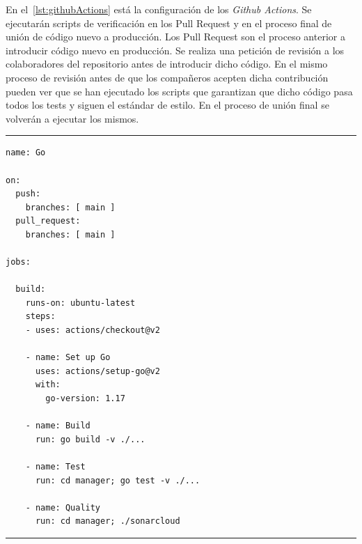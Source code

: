 En el~\cref{lst:githubActions} está la configuración de los \textit{Github Actions}.
Se ejecutarán scripts de verificación en los Pull Request y en el proceso final de unión de código nuevo a producción.
Los Pull Request son el proceso anterior a introducir código nuevo en producción.
Se realiza una petición de revisión a los colaboradores del repositorio antes de introducir dicho código.
En el mismo proceso de revisión antes de que los compañeros acepten dicha contribución pueden ver que se han ejecutado los scripts que garantizan que dicho código pasa todos los tests y siguen el estándar de estilo.
En el proceso de unión final se volverán a ejecutar los mismos.

\phantom{blank}
\vspace{10mm}
\hrule

\begin{lstlisting}[language=github,caption={Dockerfile.yml},breaklines=true,label={lst:githubActions}]
name: Go

on:
  push:
    branches: [ main ]
  pull_request:
    branches: [ main ]

jobs:

  build:
    runs-on: ubuntu-latest
    steps:
    - uses: actions/checkout@v2

    - name: Set up Go
      uses: actions/setup-go@v2
      with:
        go-version: 1.17

    - name: Build
      run: go build -v ./...

    - name: Test
      run: cd manager; go test -v ./...

    - name: Quality
      run: cd manager; ./sonarcloud
\end{lstlisting}

\hrule
